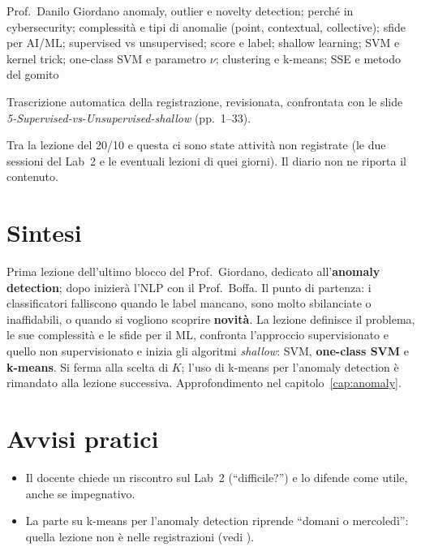   {Prof.~Danilo Giordano}
  {anomaly, outlier e novelty detection; perché in cybersecurity; complessità e tipi di anomalie (point,
   contextual, collective); sfide per AI/ML; supervised vs unsupervised; score e label; shallow learning;
   SVM e kernel trick; one-class SVM e parametro $\nu$; clustering e k-means; SSE e metodo del gomito}
\label{lez:2026-11-02}

\begin{nota}[Fonte]
Trascrizione automatica della registrazione, revisionata, confrontata con le slide
\emph{5-Supervised-vs-Unsupervised-shallow} (pp.~1--33).
\end{nota}

\begin{verifica}
Tra la lezione del 20/10 e questa ci sono state attività non registrate (le due sessioni del Lab~2 e
le eventuali lezioni di quei giorni). Il diario non ne riporta il contenuto.
\end{verifica}

\section{Sintesi}
Prima lezione dell'ultimo blocco del Prof.~Giordano, dedicato all'\textbf{anomaly detection}; dopo
inizierà l'NLP con il Prof.~Boffa. Il punto di partenza: i classificatori falliscono quando le label
mancano, sono molto sbilanciate o inaffidabili, o quando si vogliono scoprire \textbf{novità}. La lezione
definisce il problema, le sue complessità e le sfide per il ML, confronta l'approccio supervisionato e
quello non supervisionato e inizia gli algoritmi \emph{shallow}: SVM, \textbf{one-class SVM} e
\textbf{k-means}. Si ferma alla scelta di $K$; l'uso di k-means per l'anomaly detection è rimandato alla
lezione successiva. Approfondimento nel capitolo~\ref{cap:anomaly}.

\section{Avvisi pratici}
\begin{itemize}
  \item Il docente chiede un riscontro sul Lab~2 (``difficile?'') e lo difende come utile, anche se
    impegnativo.
  \item La parte su k-means per l'anomaly detection riprende ``domani o mercoledì'': quella lezione non è
    nelle registrazioni (vedi ).
\end{itemize}


